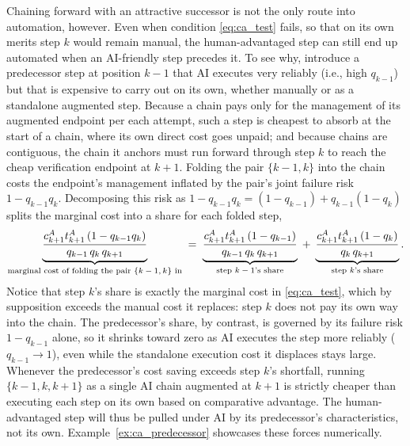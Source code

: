 Chaining forward with an attractive successor is not the only route into automation, however.
Even when condition \eqref{eq:ca_test} fails, so that on its own merits step $k$ would remain manual, the human-advantaged step can still end up automated when an AI-friendly step precedes it.
To see why, introduce a predecessor step at position $k-1$ that AI executes very reliably (i.e., high $q_{k-1}$) but that is expensive to carry out on its own, whether manually or as a standalone augmented step.
Because a chain pays only for the management of its augmented endpoint per each attempt, such a step is cheapest to absorb at the start of a chain, where its own direct cost goes unpaid; and because chains are contiguous, the chain it anchors must run forward through step $k$ to reach the cheap verification endpoint at $k+1$.
Folding the pair $\{k-1, k\}$ into the chain costs the endpoint's management inflated by the pair's joint failure risk $1 - q_{k-1}q_k$. 
Decomposing this risk as $1 - q_{k-1}q_k = (1-q_{k-1}) + q_{k-1}(1-q_k)$ splits the marginal cost into a share for each folded step,
\[
\underbrace{\frac{c^{A}_{k+1}t^{A}_{k+1}\,(1-q_{k-1}q_k)}{q_{k-1}\,q_k\,q_{k+1}}}_{\text{marginal cost of folding the pair $\{k-1, k\}$ in}}
\;=\;
\underbrace{\frac{c^{A}_{k+1}t^{A}_{k+1}\,(1-q_{k-1})}{q_{k-1}\,q_k\,q_{k+1}}}_{\text{step $k-1$'s share}}
\;+\;
\underbrace{\frac{c^{A}_{k+1}t^{A}_{k+1}\,(1-q_k)}{q_k\,q_{k+1}}}_{\text{step $k$'s share}}.
\]
Notice that step $k$'s share is exactly the marginal cost in \eqref{eq:ca_test}, which by supposition exceeds the manual cost it replaces: step $k$ does not pay its own way into the chain.
The predecessor's share, by contrast, is governed by its failure risk $1 - q_{k-1}$ alone, so it shrinks toward zero as AI executes the step more reliably ($q_{k-1} \to 1$), even while the standalone execution cost it displaces stays large.
Whenever the predecessor's cost saving exceeds step $k$'s shortfall, running $\{k-1, k, k+1\}$ as a single AI chain augmented at $k+1$ is strictly cheaper than executing each step on its own based on comparative advantage. 
The human-advantaged step will thus be pulled under AI by its predecessor's characteristics, not its own.
Example~\ref{ex:ca_predecessor} showcases these forces numerically.

